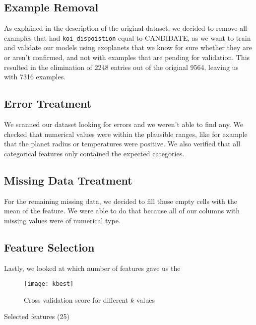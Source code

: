 \subsection{Example Removal}

As explained in the description of the original dataset, we decided to remove all examples
that had \texttt{koi\_dispoistion} equal to CANDIDATE, as we want to train and validate our
models using exoplanets that we know for sure whether they are or aren't confirmed, and not
with examples that are pending for validation. This resulted in the elimination of 2248 entries
out of the original 9564, leaving us with 7316 examples.

\subsection{Error Treatment}

We scanned our dataset looking for errors and we weren't able to find any. We checked
that numerical values were within the plausible ranges, like for example that the
planet radius or temperatures were positive. We also verified that all categorical 
features only contained the expected categories.

\subsection{Missing Data Treatment}

For the remaining missing data, we decided to fill those empty cells with the mean
of the feature. We were able to do that because all of our columns with missing values
were of numerical type.

\subsection{Feature Selection}%
\label{sub:feature_removal}

Lastly, we looked at which number of features gave us the 


\begin{figure}[H]
    \centering
    \texttt{[image: kbest]}
    \caption{Cross validation score for different $k$ values}%
    \label{fig:feature_cross}
\end{figure}

\begin{table}[H]
    \centering
    \caption{Selected features (25)}%
    \label{tab:features}
    
\end{table}